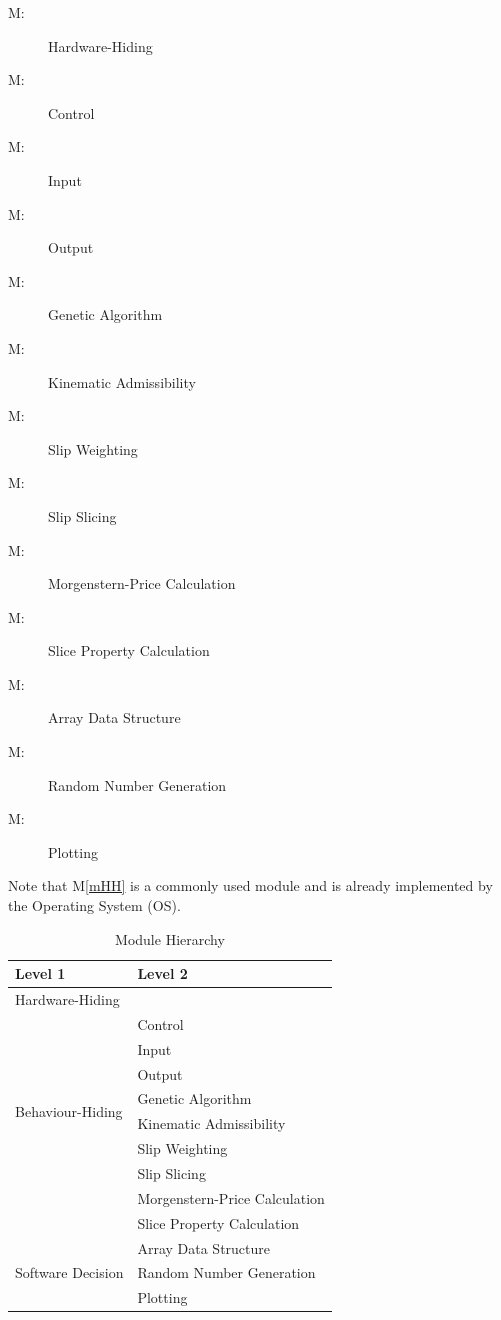 \documentclass[12pt, titlepage]{article}
\newcounter{mnum}
\newcommand{\mthemnum}{M\themnum}
\newcommand{\mref}[1]{M\ref{#1}}
\begin{document}
\begin{description}
\item [ \mthemnum \label{mHH}:] Hardware-Hiding
\item [ \mthemnum \label{mControl}:] Control
\item [ \mthemnum \label{mInput}:] Input
\item [ \mthemnum \label{mOutput}:] Output
\item [ \mthemnum \label{mGenAlg}:] Genetic
  Algorithm
\item [ \mthemnum \label{mKinAdm}:] Kinematic
  Admissibility
\item [ \mthemnum \label{mSlipWeight}:] Slip Weighting
\item [ \mthemnum \label{mSlipSlicer}:] Slip Slicing
\item [ \mthemnum \label{mMorgPrice}:]
  Morgenstern-Price Calculation
\item [ \mthemnum \label{mSliceProperty}:] Slice
  Property Calculation
\item [ \mthemnum \label{mArrayOps}:] Array Data Structure
\item [ \mthemnum \label{mRandNum}:] Random Number     
Generation
\item [ \mthemnum \label{mPlot}:] Plotting
\end{description}

Note that \mref{mHH} is a commonly used module and is already
implemented by the Operating System (OS).

\begin{table}[h!]
\centering
\begin{tabular}{p{} p{} }
\toprule
\textbf{Level 1} & \textbf{Level 2} \\
\midrule

{Hardware-Hiding} & ~ \\
\midrule

\multirow{8}{0.3\textwidth}{Behaviour-Hiding} &
Control \\
& Input \\
& Output \\
& Genetic Algorithm \\
& Kinematic Admissibility \\
& Slip Weighting \\
& Slip Slicing \\
& Morgenstern-Price Calculation \\
& Slice Property Calculation \\
\midrule

\multirow{3}{0.3\textwidth}{Software Decision} &
Array Data Structure \\
& Random Number Generation \\
& Plotting \\
\bottomrule

\end{tabular}
\caption{Module Hierarchy}
\label{Table:Decomp}
\end{table}
\end{document}
